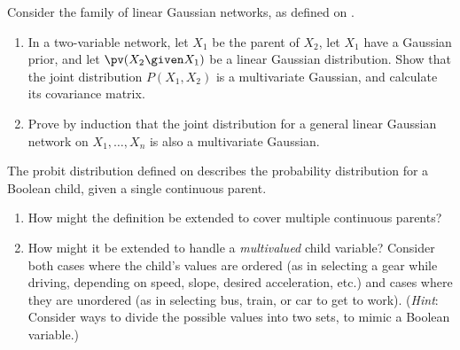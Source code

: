 \begin{exercise}[LG-exercise]
Consider the family of linear Gaussian networks, as defined on
. 
\begin{enumerate}
\item In a two-variable network, let \(X_1\) be the parent of \(X_2\), let
\(X_1\) have a Gaussian prior, and let \(\pv(X_2\given X_1)\) be a linear Gaussian
distribution. Show that the joint distribution \(P(X_1,X_2)\) is a
multivariate Gaussian, and calculate its covariance matrix.
\item Prove by induction that the joint distribution for a general
linear Gaussian network on \(X_1,\ldots,X_n\) is also a multivariate Gaussian.
\end{enumerate}
\end{exercise} 

\begin{exercise}
The probit distribution defined on  describes the
probability distribution for a Boolean child, given a single continuous
parent.
\begin{enumerate}
\item How might the definition be extended to cover multiple continuous parents?
\item How might it be extended to handle a {\em multivalued} child
variable? Consider both cases where the child's values are ordered (as
in selecting a gear while driving, depending on speed, slope, desired
acceleration, etc.) and cases where they are unordered (as in
selecting bus, train, or car to get to work). ({\em Hint}: Consider
ways to divide the possible values into two sets, to mimic a Boolean
variable.)
\end{enumerate}
\end{exercise} 



